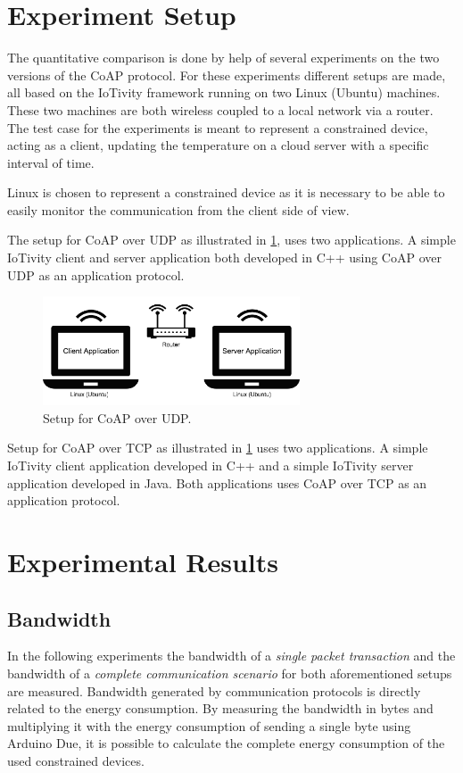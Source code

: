 \section{Experiment Setup}
The quantitative comparison is done by help of several experiments on the two versions of the CoAP protocol. For these experiments different setups are made, all based on the IoTivity framework running on two Linux (Ubuntu) machines. These two machines are both wireless coupled to a local network via a router. The test case for the experiments is meant to represent a constrained device, acting as a client, updating the temperature on a cloud server with a specific interval of time. 

Linux is chosen to represent a constrained device as it is necessary to be able to easily monitor the communication from the client side of view.

The setup for CoAP over UDP as illustrated in \figurename \ref{fig:setup}, uses two applications. A simple IoTivity client and server application both developed in C++ using CoAP over UDP as an application protocol.
\begin{figure}[bht]
	\centering
	\includegraphics[width=3in]{gfx/setupa}
	\caption{Setup for CoAP over UDP.}
	\label{fig:setup}
\end{figure}

Setup for CoAP over TCP as illustrated in \figurename \ref{fig:setup} uses two applications. A simple IoTivity client application developed in C++ and a simple IoTivity server application developed in Java. Both applications uses CoAP over TCP as an application protocol.


\section{Experimental Results}
\subsection{Bandwidth}
In the following experiments the bandwidth of a \emph{single packet transaction} and the bandwidth of a \emph{complete communication scenario} for both aforementioned setups are measured. 
Bandwidth generated by communication protocols is directly related to the energy consumption. By measuring the bandwidth in bytes and multiplying it with the energy consumption of sending a single byte using Arduino Due, it is possible to calculate the complete energy consumption of the used constrained devices. 


